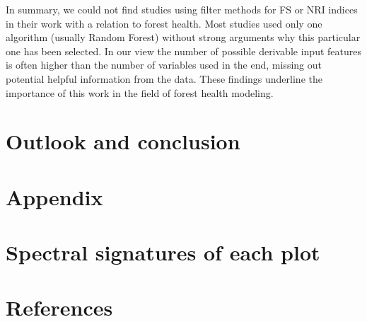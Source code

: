 \documentclass[review]{elsarticle}
\begin{document}
In summary, we could not find studies using filter methods for \ac{FS} or \ac{NRI} indices in their work with a relation to forest health.
Most studies used only one algorithm (usually Random Forest) without strong arguments why this particular one has been selected.
In our view the number of possible derivable input features is often higher than the number of variables used in the end, missing out potential helpful information from the data.
These findings underline the importance of this work in the field of forest health modeling.

\section{Outlook and conclusion}

\section{Appendix}

\appendix
\gdef\thesection{\Alph{section}} %
\makeatletter
\renewcommand\@seccntformat[1]{Appendix \csname the#1\endcsname.\hspace{0.5em}}
\makeatother

\section{Spectral signatures of each plot}


\pagebreak


\section*{References}


\end{document}
